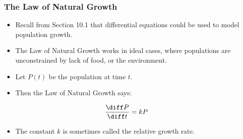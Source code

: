 \begin{frame}
\frametitle{The Law of Natural Growth}
\begin{itemize}
\item  Recall from Section 10.1 that differential equations could be used to model population growth.
\item  The Law of Natural Growth works in ideal cases, where populations are unconstrained by lack of food, or the environment.
\item  Let $P(t)$ be the population at time $t$.
\item  Then the Law of Natural Growth says:
\end{itemize}
\[
\frac{\diff P}{\diff t} = kP
\]
\begin{itemize}
\item  The constant $k$ is sometimes called the relative growth rate.
\end{itemize}
\end{frame}
